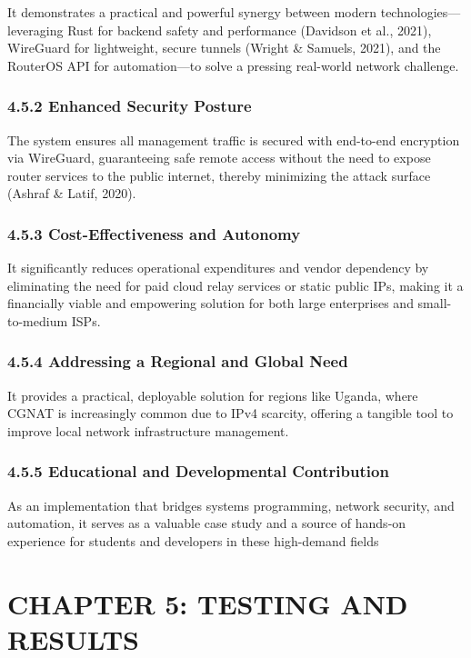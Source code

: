 \documentclass[12pt,a4paper,oneside]{report}
\begin{document}
It demonstrates a practical and powerful synergy between modern technologies---leveraging Rust for backend safety and performance (Davidson et al., 2021), WireGuard for lightweight, secure tunnels (Wright \& Samuels, 2021), and the RouterOS API for automation---to solve a pressing real-world network challenge.


\subsection{4.5.2 Enhanced Security Posture}

The system ensures all management traffic is secured with end-to-end encryption via WireGuard, guaranteeing safe remote access without the need to expose router services to the public internet, thereby minimizing the attack surface (Ashraf \& Latif, 2020).


\subsection{4.5.3 Cost-Effectiveness and Autonomy}

It significantly reduces operational expenditures and vendor dependency by eliminating the need for paid cloud relay services or static public IPs, making it a financially viable and empowering solution for both large enterprises and small-to-medium ISPs.


\subsection{4.5.4 Addressing a Regional and Global Need}

It provides a practical, deployable solution for regions like Uganda, where CGNAT is increasingly common due to IPv4 scarcity, offering a tangible tool to improve local network infrastructure management.


\subsection{4.5.5 Educational and Developmental Contribution}

As an implementation that bridges systems programming, network security, and automation, it serves as a valuable case study and a source of hands-on experience for students and developers in these high-demand fields




\chapter{CHAPTER 5: TESTING AND RESULTS}
\end{document}
